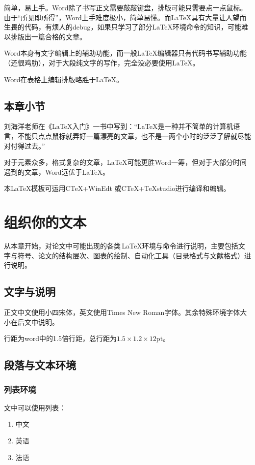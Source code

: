 简单，易上手。Word除了书写正文需要敲敲键盘，排版可能只需要点一点鼠标。由于“所见即所得”，Word上手难度极小，简单易懂。而\LaTeX 具有大量让人望而生畏的代码，有烦人的debug，如果只学习了部分\LaTeX 环境命令的知识，可能难以排版出一篇合格的文章。

Word本身有文字编辑上的辅助功能，而一般\LaTeX 编辑器只有代码书写辅助功能（还很鸡肋），对于大段纯文字的写作，完全没必要使用\LaTeX 。

Word在表格上编辑排版略胜于\LaTeX 。

\subsection{本章小节}
刘海洋老师在《\LaTeX 入门》一书中写到：“\LaTeX 是一种并不简单的计算机语言，不能只点点鼠标就弄好一篇漂亮的文章，也不是一两个小时的泛泛了解就尽能对付得过去。”

对于元素众多，格式复杂的文章，\LaTeX 可能更胜Word一筹，但对于大部分时间遇到的文章，Word远优于\LaTeX 。

本\LaTeX 模板可运用CTeX+WinEdt 或CTeX+TeXstudio进行编译和编辑。

\newpage\vspace*{-21.6pt}
\section{组织你的文本}
从本章开始，对论文中可能出现的各类\,\LaTeX 环境与命令进行说明，主要包括文字与符号、论文的结构层次、图表的绘制、自动化工具（目录格式与文献格式）进行说明。

\subsection{文字与说明}
正文中文使用小四宋体，英文使用Times New Roman字体。其余特殊环境字体大小在后文中说明。

行距为word中的1.5倍行距，总行距为$1.5\times 1.2\times 12\mathrm{pt} $。

\subsection{段落与文本环境}
\subsubsection{列表环境}
文中可以使用列表：
\begin{enumerate}
  \item 中文
  \item 英语
  \item 法语
\end{enumerate}

